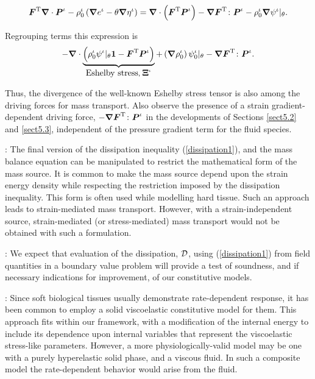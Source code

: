 \begin{equation}
\mbox{\boldmath$ F$}^\mathrm{T}\mbox{\boldmath$\nabla$}\cdot\mbox{\boldmath$ P$}^\iota - \rho^\iota_0\left(\mbox{\boldmath$\nabla$}
e^\iota - \theta\mbox{\boldmath$\nabla$}\eta^\iota\right) =
\mbox{\boldmath$\nabla$}\cdot\left(\mbox{\boldmath$ F$}^\mathrm{T}\mbox{\boldmath$ P$}^\iota\right) -
\mbox{\boldmath$\nabla$}\mbox{\boldmath$ F$}^\mathrm{T}\colon\mbox{\boldmath$ P$}^\iota
 - \rho^\iota_0\mbox{\boldmath$\nabla$}\psi^\iota\vert_\theta.
\end{equation}

\noindent Regrouping terms this expression is
\begin{equation}
-\mbox{\boldmath$\nabla$}\cdot\underbrace{\left(\rho^\iota_0\psi^\iota\vert_\theta{\bf 1}
- \mbox{\boldmath$ F$}^\mathrm{T}\mbox{\boldmath$ P$}^\iota\right)}_{\mbox{Eshelby
stress},\;\mbox{\boldmath$\Xi$}^\iota} +
\left(\mbox{\boldmath$\nabla$}\rho^\iota_0\right)\psi^\iota_0\vert_\theta -
\mbox{\boldmath$\nabla$}\mbox{\boldmath$ F$}^\mathrm{T}\colon\mbox{\boldmath$ P$}^\iota.
\end{equation}

Thus, the divergence of the well-known Eshelby stress tensor is
also among the driving forces for mass transport. Also observe the
presence of a strain gradient-dependent driving force,
$-\mbox{\boldmath$\nabla$}\mbox{\boldmath$ F$}^\mathrm{T}\colon\mbox{\boldmath$ P$}^\iota$ in the developments of
Sections \ref{sect5.2} and \ref{sect5.3}, independent of the
pressure gradient term for the fluid species.


: The final version of the dissipation
inequality (\ref{dissipation1}), and the mass balance equation can
be manipulated to restrict the mathematical form of the mass
source. It is common to make the mass source depend upon the
strain energy density \citep{HarriganHamilton:1993} while
respecting the restriction imposed by the dissipation inequality.
This form is often used while modelling hard tissue. Such an
approach leads to strain-mediated mass transport. However, with a
strain-independent source, strain-mediated (or stress-mediated)
mass transport would not be obtained with such a formulation.

: We expect that evaluation of the
dissipation, ${\mathcal D}$, using (\ref{dissipation1}) from field
quantities in a boundary value problem will provide a test of
soundness, and if necessary indications for improvement, of our
constitutive models.

: Since soft biological tissues usually
demonstrate rate-dependent response, it has been common to employ
a solid viscoelastic constitutive model for them. This approach
fits within our framework, with a modification of the internal
energy to include its dependence upon internal variables that
represent the viscoelastic stress-like parameters. However, a more
physiologically-valid model may be one with a purely hyperelastic
solid phase, and a viscous fluid. In such a composite model the
rate-dependent behavior would arise from the fluid.

